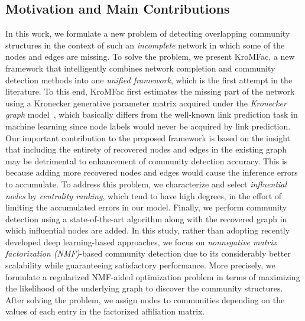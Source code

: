 \documentclass[format=acmsmall, review=false, screen=true]{acmart}
\begin{document}
\subsection{Motivation and Main Contributions}
In this work, we formulate a new problem of detecting overlapping community structures in the context of such an {\em incomplete} network in which some of the nodes and edges are missing. To solve the problem, we present \textsf{KroMFac}, a new framework that intelligently combines network completion and community detection methods into one {\em unified framework}, which is the first attempt in the literature. To this end, \textsf{KroMFac} first estimates the missing part of the network using a Kronecker generative parameter matrix acquired under the {\em Kronecker graph} model~\cite{kronem}, which basically differs from the well-known link prediction task in machine learning since node labels would never be acquired by link prediction. Our important contribution to the proposed framework is based on the insight that including the entirety of recovered nodes and edges in the existing graph may be detrimental to enhancement of community detection accuracy. This is because adding more recovered nodes and edges would cause the inference errors to accumulate. To address this problem, we characterize and select {\em influential nodes} by {\em centrality ranking}, which tend to have high degrees, in the effort of limiting the accumulated errors in our model. Finally, we perform community detection using a state-of-the-art algorithm along with the recovered graph in which influential nodes are added. In this study, rather than adopting recently developed deep learning-based approaches,  we focus on {\em nonnegative matrix factorization (NMF)}-based community detection due to its considerably better scalability while guaranteeing satisfactory performance. More precisely, we formulate a regularized NMF-aided optimization problem in terms of maximizing the likelihood of the underlying graph to discover the community structures. After solving the problem, we assign nodes to communities depending on the values of each entry in the factorized affiliation matrix. 
\end{document}

